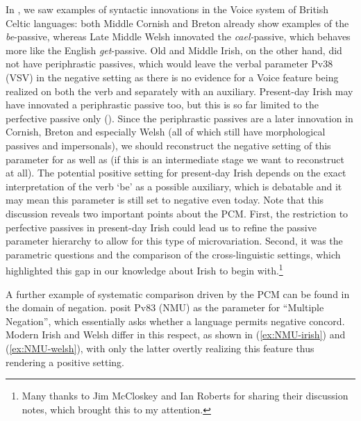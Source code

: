 \documentclass[output=paper,colorlinks,citecolor=brown]{langscibook}
\begin{document}
\noindent In , we saw examples of syntactic innovations in the Voice system of British Celtic languages: both Middle Cornish and Breton already show examples of the \textit{be}-passive, whereas Late Middle Welsh innovated the \textit{cael-}passive, which behaves more like the English \textit{get}-passive. Old and Middle Irish, on the other hand, did not have periphrastic passives, which would leave the verbal parameter Pv38 (VSV) in the negative setting as there is no evidence for a Voice feature being realized on both the verb and separately with an auxiliary. Present-day Irish may have innovated a periphrastic passive too, but this is so far limited to the perfective passive only (\cite[254--255]{mm:mccloskey_scope_1996}). Since the periphrastic passives are a later innovation in Cornish, Breton and especially Welsh (all of which still have morphological passives and impersonals), we should reconstruct the negative setting of this parameter for  as well as  (if this is an intermediate stage we want to reconstruct at all). The potential positive setting for present-day Irish depends on the exact interpretation of the verb `be' as a possible auxiliary, which is debatable and it may mean this parameter is still set to negative even today. Note that this discussion reveals two important points about the PCM. First, the restriction to perfective passives in present-day Irish could lead us to refine the passive parameter hierarchy to allow for this type of microvariation. Second, it was the parametric questions and the comparison of the cross-linguistic settings, which highlighted this gap in our knowledge about Irish to begin with.\footnote{Many thanks to Jim McCloskey and Ian Roberts for sharing their discussion notes, which brought this to my attention.}

A further example of systematic comparison driven by the PCM can be found in the domain of negation. \citet{mm:bakerroberts2024} posit Pv83 (NMU) as the parameter for “Multiple Negation”, which essentially asks whether a language permits negative concord. Modern Irish and Welsh differ in this respect, as shown in (\ref{ex:NMU-irish}) and (\ref{ex:NMU-welsh}), with only the latter overtly realizing this feature thus rendering a positive setting.
\end{document}
